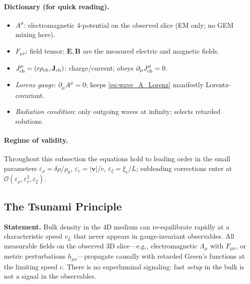 \paragraph{Dictionary (for quick reading).}
\begin{itemize}
\item \(A^\mu\): electromagnetic 4-potential on the observed slice (EM only; no GEM mixing here).
\item \(F_{\mu\nu}\): field tensor; \(\mathbf E,\mathbf B\) are the measured electric and magnetic fields.
\item \(J^\mu_{\rm ch}=(c\rho_{\rm ch},\mathbf J_{\rm ch})\): charge/current; obeys \(\partial_\mu J^\mu_{\rm ch}=0\).
\item \emph{Lorenz gauge}: \(\partial_\mu A^\mu=0\); keeps \eqref{eq:wave_A_Lorenz} manifestly Lorentz-covariant.
\item \emph{Radiation condition}: only outgoing waves at infinity; selects retarded solutions.
\end{itemize}

\paragraph{Regime of validity.}
Throughout this subsection the equations hold to leading order in the small parameters
\(\varepsilon_\rho=\delta\rho/\rho_0\),
\(\varepsilon_v=|\mathbf v|/c\),
\(\varepsilon_\xi=\xi_c/L\);
subleading corrections enter at \(\mathcal O(\varepsilon_\rho,\varepsilon_v^2,\varepsilon_\xi)\).

\subsection{The Tsunami Principle}

\textbf{Statement.} Bulk density in the 4D medium can re-equilibrate rapidly at a characteristic speed $v_L$ that never appears in gauge-invariant observables. All measurable fields on the observed 3D slice---e.g., electromagnetic $A_\mu$ with $F_{\mu\nu}$, or metric perturbations $h_{\mu\nu}$---propagate causally with retarded Green's functions at the limiting speed $c$. There is no superluminal signaling: fast \emph{setup} in the bulk is not a signal in the observables.

